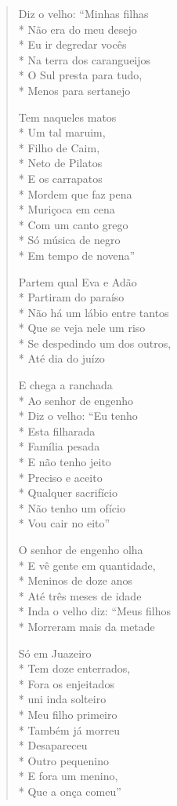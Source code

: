 \begin{verse}
Diz o velho: ``Minhas filhas\\*
Não era do meu desejo\\*
Eu ir degredar vocês\\*
Na terra dos carangueijos\\*
O Sul presta para tudo,\\*
Menos para sertanejo

Tem naqueles matos\\*
Um tal maruim,\\*
Filho de Caim,\\*
Neto de Pilatos\\*
E os carrapatos\\*
Mordem que faz pena\\*
Muriçoca em cena\\*
Com um canto grego\\*
Só música de negro\\*
Em tempo de novena''

Partem qual Eva e Adão\\*
Partiram do paraíso\\*
Não há um lábio entre tantos\\*
Que se veja nele um riso\\*
Se despedindo um dos outros,\\*
Até dia do juízo

E chega a ranchada\\*
Ao senhor de engenho\\*
Diz o velho: ``Eu tenho\\*
Esta filharada\\*
Família pesada\\*
E não tenho jeito\\*
Preciso e aceito\\*
Qualquer sacrifício\\*
Não tenho um ofício\\*
Vou cair no eito''

O senhor de engenho olha\\*
E vê gente em quantidade,\\*
Meninos de doze anos\\*
Até três meses de idade\\*
Inda o velho diz: ``Meus filhos\\*
Morreram mais da metade

Só em Juazeiro\\*
Tem doze enterrados,\\*
Fora os enjeitados\\*
uni inda solteiro\\*
Meu filho primeiro\\*
Também já morreu\\*
Desapareceu\\*
Outro pequenino\\*
E fora um menino,\\*
Que a onça comeu''


\end{verse}
